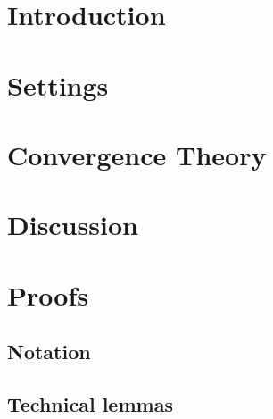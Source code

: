 




\maketitle

\begin{abstract}

\end{abstract}

\section{Introduction}


\section{Settings} 


\section{Convergence Theory} 



\section{Discussion} \label{sec:discussion}





\tableofcontents
\newpage

\section{Proofs} \label{sec:proofs}

\subsection{Notation}


\subsection{Technical lemmas}


